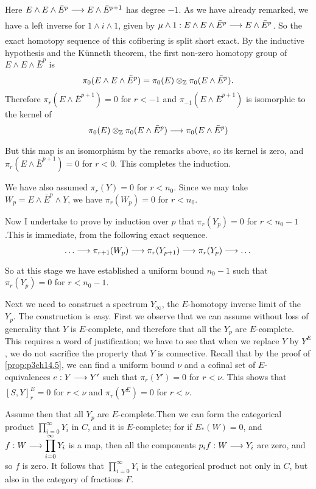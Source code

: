 \documentclass[../main]{subfiles}
\begin{document}
Here $E\wedge E\wedge\bar{E}^p\lar{}{E\wedge\bar{E}^{p+1}} $ has degree $-1$. As we have already remarked, we have a left inverse for $1\wedge i\wedge 1$, given by $\mu \wedge 1:E\wedge E\wedge \bar{E}^p\lar{}E\wedge\bar{E}^p  $. So the exact homotopy sequence of this cofibering is split short exact. By the inductive hypothesis and the K\"unneth
theorem, the first non-zero homotopy group of $E\wedge E\wedge\bar{E}^p$ is \[\pi_0(E\wedge E\wedge\bar{E}^p) = \pi_0(E) \otimes_{\mathbb{Z}} \pi_0(E\wedge \bar{E}^p).\]
Therefore $\pi_r(E\wedge \bar{E}^{p+1})=0$ for $r<-1$ and $\pi_{-1}(E\wedge \bar{E}^{p+1})$ is isomorphic to the kernel of \[\pi_0(E) \otimes_\bZ \pi_0(E\wedge \bar{E}^p) \lar{}\pi_0(E\wedge \bar{E}^p)\] 
But this map is an isomorphism by the remarks above, so its kernel is
zero, and $\pi_{r}(E\wedge \bar{E}^{p+1})=0$ for $r<0$. This completes the induction.

We have also assumed $\pi_r(Y)=0$ for $r<n_0$. Since we may take $W_p=E\wedge \bar{E}^p\wedge Y$, we have $\pi_r(W_p)=0$ for $r<n_0$.

Now I undertake to prove by induction over $p$ that $\pi_r(Y_p)=0$ for $r<n_0-1$.This is immediate, from the following exact sequence. \[\dots \lar{}\pi_{r+1}(W_p)\lar{} \pi_r(Y_{p+1}) \lar{} \pi_r(Y_p)\lar{} \dots \]
So at this stage we have established a uniform bound $n_0-1$ such that $\pi_r(Y_p)=0$ for $r<n_0-1$.

Next we need to construct a spectrum $Y_\infty$, the $E$-homotopy inverse 
limit of the $Y_p$. The construction is easy. First we observe that we
can assume without loss of generality that $Y$ is $E$-complete, and therefore that all the $Y_p$ are $E$-complete. This requires a word of
justification; we have to see that when we replace $Y$ by $Y^E$, we do not
sacrifice the property that $Y$ is connective. Recall that by the proof of \ref{prop:p3ch14.5}, we can find a uniform bound $\nu$ and a cofinal set of
$E$-equivalences $e: Y\lar{} Y'$ such that $\pi_r (Y')=0$ for $r<\nu$. This
shows that $[S,Y]^E_r=0$ for $r<\nu$ and $\pi_r(Y^E)=0$ for $r<\nu$.

Assume then that all $Y_p$ are $E$-complete.Then we can form the categorical product $\displaystyle \prod_{i=0}^\infty Y_i $ in $C$, and it is $E$-complete; for if $E_\ast(W)=0$, and $\displaystyle f:W\lar{} \prod_{i=0}^\infty Y_i$ is a map, then all the components $p_i f:W\lar{}Y_i$ are zero, and so $f$ is zero. It follows that $\displaystyle\prod_{i=0}^\infty Y_i$ is the categorical product not only in $C$, but also in the category of fractions $F$.
\end{document}
